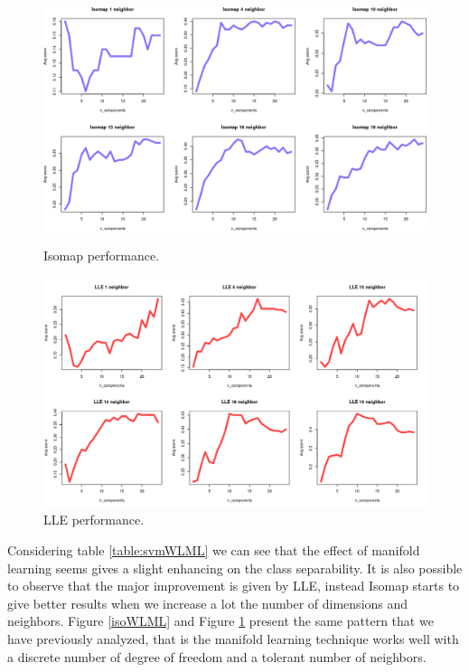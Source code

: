 \documentclass[11pt,a4paper]{article}
\begin{document}
\begin{figure}[H]
	\begin{minipage}[t]{0.5\linewidth}
		\centering
		\includegraphics[width=1\textwidth]{img/IsomapWL_shock.png}
		\caption{Isomap performance.}
		\label{isoWLML}
	\end{minipage}
	\hspace{0.1cm}
	\begin{minipage}[t]{0.5\linewidth} 
		\centering
		\includegraphics[width=1\textwidth]{img/LLEwl_shock.png}
		\caption{LLE performance.}
		\label{lleWLML}
	\end{minipage}        
\end{figure}
Considering table \ref{table:svmWLML} we can see that the effect of manifold learning seems gives  a slight enhancing on the class separability. It is also possible to observe that the major improvement is given by LLE, instead Isomap starts to give better results when we increase a lot the number of dimensions and neighbors. Figure \ref{isoWLML} and Figure \ref{lleWLML} present the same pattern that we have previously analyzed, that is the manifold learning technique works well with a discrete number of degree of freedom and a tolerant number of neighbors.
\end{document}
